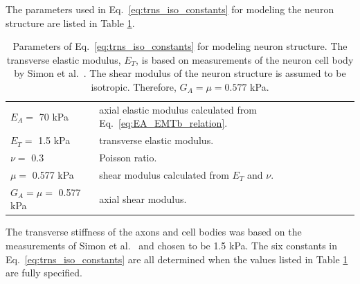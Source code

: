 \documentclass[]{interact}
\begin{document}
The parameters used in Eq.\ \eqref{eq:trns_iso_constants} for modeling the neuron structure are listed in Table \ref{table:neuron_parameters}. 
\begin{table}[ht]
\begin{center}
\begin{tabular}{ l l }
\hline \hline
$E_A = $ 70 kPa  & axial elastic modulus calculated from Eq.\ \eqref{eq:EA_EMTb_relation}. \\ 
$E_T = $ 1.5 kPa & transverse elastic modulus. \\
$\nu = $ 0.3 & Poisson ratio. \\
$\mu = $ 0.577 kPa & shear modulus calculated from $E_T$ and $\nu$. \\ 
$G_A = \mu = $ 0.577 kPa & axial shear modulus.\\ \hline \hline
\end{tabular}
\end{center}
\caption{Parameters of Eq.\ \eqref{eq:trns_iso_constants} for modeling neuron structure. The transverse elastic modulus, $E_T$, is based on measurements of the neuron cell body by Simon et al.\ \citep{Simon:2016ig}. The shear modulus of the neuron structure is assumed to be isotropic. Therefore, $G_A = \mu = 0.577$ kPa.}
\label{table:neuron_parameters}
\end{table}
%
The transverse stiffness of the axons and cell bodies was based on the measurements of Simon et al.\ \citep{Simon:2016ig} and chosen to be 1.5 kPa. The six constants in Eq.\ \eqref{eq:trns_iso_constants} are all determined when the values listed in Table \ref{table:neuron_parameters} are fully specified.
\end{document}
